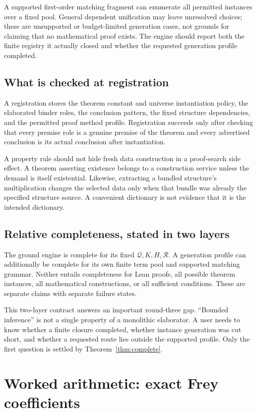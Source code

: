 \documentclass[11pt,a4paper]{article}
\theoremstyle{definition}\newtheorem{definition}[theorem]{Definition}
\theoremstyle{remark}\newtheorem{remark}[theorem]{Remark}
\begin{document}
A supported first-order matching fragment can enumerate all permitted instances over a fixed pool. General dependent unification may leave unresolved choices; these are unsupported or budget-limited generation cases, not grounds for claiming that no mathematical proof exists. The engine should report both the finite registry it actually closed and whether the requested generation profile completed.

\subsection{What is checked at registration}
A registration stores the theorem constant and universe instantiation policy, the elaborated binder roles, the conclusion pattern, the fixed structure dependencies, and the permitted proof method profile. Registration succeeds only after checking that every premise role is a genuine premise of the theorem and every advertised conclusion is its actual conclusion after instantiation.

A property rule should not hide fresh data construction in a proof-search side effect. A theorem asserting existence belongs to a construction service unless the demand is itself existential. Likewise, extracting a bundled structure's multiplication changes the selected data only when that bundle was already the specified structure source. A convenient dictionary is not evidence that it is the intended dictionary.

\subsection{Relative completeness, stated in two layers}
The ground engine is complete for its fixed $\mathcal Q,K,H,\mathcal R$. A generation profile can additionally be complete for its own finite term pool and supported matching grammar. Neither entails completeness for Lean proofs, all possible theorem instances, all mathematical constructions, or all sufficient conditions. These are separate claims with separate failure states.

This two-layer contract answers an important round-three gap. ``Bounded inference'' is not a single property of a monolithic elaborator. A user needs to know whether a finite closure completed, whether instance generation was cut short, and whether a requested route lies outside the supported profile. Only the first question is settled by Theorem~\ref{thm:complete}.

\section{Worked arithmetic: exact Frey coefficients}\label{sec:frey}
\end{document}
